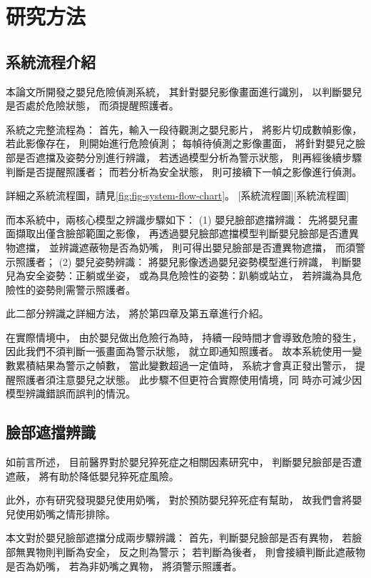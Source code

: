 \documentclass[class=NCU_thesis, crop=false]{standalone}
\begin{document}
\chapter{研究方法}

\section{系統流程介紹}
本論文所開發之嬰兒危險偵測系統，
其針對嬰兒影像畫面進行識別，
以判斷嬰兒是否處於危險狀態，
而須提醒照護者。

系統之完整流程為：
首先，輸入一段待觀測之嬰兒影片，
將影片切成數幀影像，
若此影像存在，
則開始進行危險偵測；
每幀待偵測之影像畫面，
將針對嬰兒之臉部是否遮擋及姿勢分別進行辨識，
若透過模型分析為警示狀態，
則再經後續步驟判斷是否提醒照護者；
而若分析為安全狀態，
則可接續下一幀之影像進行偵測。

詳細之系統流程圖，請見\cref{fig:fig-system-flow-chart}。
[系統流程圖][系統流程圖]

而本系統中，兩核心模型之辨識步驟如下：
(1) 嬰兒臉部遮擋辨識：
先將嬰兒畫面擷取出僅含臉部範圍之影像，
再透過嬰兒臉部遮擋模型判斷嬰兒臉部是否遭異物遮擋，
並辨識遮蔽物是否為奶嘴，
則可得出嬰兒臉部是否遭異物遮擋，
而須警示照護者；
(2) 嬰兒姿勢辨識：
將嬰兒影像透過嬰兒姿勢模型進行辨識，
判斷嬰兒為安全姿勢：正躺或坐姿，
或為具危險性的姿勢：趴躺或站立，
若辨識為具危險性的姿勢則需警示照護者。

此二部分辨識之詳細方法，
將於第四章及第五章進行介紹。

在實際情境中，
由於嬰兒做出危險行為時，
持續一段時間才會導致危險的發生，
因此我們不須判斷一張畫面為警示狀態，
就立即通知照護者。
故本系統使用一變數累積結果為警示之幀數，
當此變數超過一定值時，
系統才會真正發出警示，
提醒照護者須注意嬰兒之狀態。
此步驟不但更符合實際使用情境，同
時亦可減少因模型辨識錯誤而誤判的情況。

\section{臉部遮擋辨識}
如前言所述，
目前醫界對於嬰兒猝死症之相關因素研究中，
判斷嬰兒臉部是否遭遮蔽，
將有助於降低嬰兒猝死症風險。

此外，亦有研究發現嬰兒使用奶嘴，
對於預防嬰兒猝死症有幫助，
故我們會將嬰兒使用奶嘴之情形排除。

本文對於嬰兒臉部遮擋分成兩步驟辨識：
首先，判斷嬰兒臉部是否有異物，
若臉部無異物則判斷為安全，
反之則為警示；
若判斷為後者，
則會接續判斷此遮蔽物是否為奶嘴，
若為非奶嘴之異物，
將須警示照護者。
\end{document}
